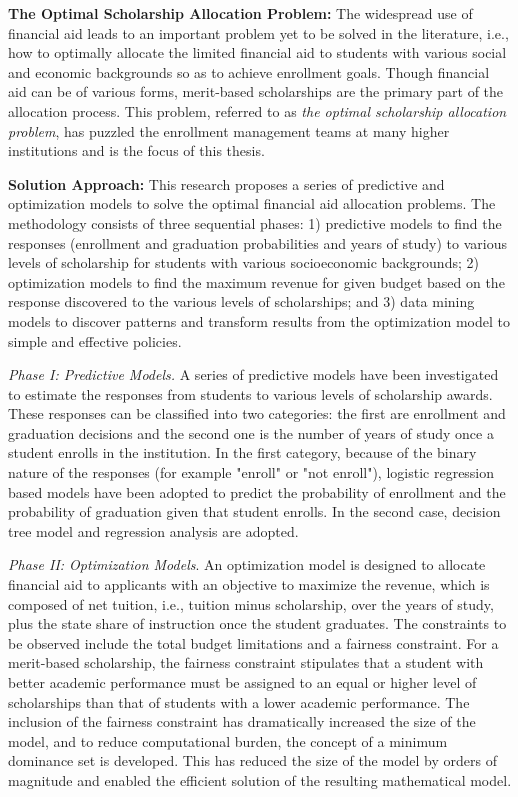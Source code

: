 \documentclass[12pt,english]{report}
\begin{document}
\vspace*{0.15in} 
\noindent \textbf{The Optimal Scholarship Allocation Problem:}  The widespread use of financial aid leads to an important problem yet to be solved in the literature, i.e., how to optimally allocate the limited financial aid to students with various social and economic backgrounds so as to achieve enrollment goals. Though financial aid can be of various forms, merit-based scholarships are the primary part of the allocation process. This problem, referred to as \textit{the optimal scholarship allocation problem}, has puzzled the enrollment management teams at many higher institutions and is the focus of this thesis.

\newpage
\noindent \textbf{Solution Approach:}  This research proposes a series of predictive and optimization models to solve the optimal financial aid allocation problems. The methodology consists of three sequential phases: 1) predictive models to find the responses (enrollment and graduation probabilities and years of study) to various levels of scholarship for students with various socioeconomic backgrounds; 2)  optimization models to find the maximum revenue for given budget based on the response discovered to the various levels of scholarships; and 3) data mining models to discover patterns and transform results from the optimization model to simple and effective policies. %

\vspace*{.1in} 
\noindent \textit{Phase I: Predictive Models.} A series of predictive models have been investigated to estimate the responses from students to various levels of scholarship awards. These responses can be classified into two categories: the first are enrollment and graduation decisions and the second one is the number of years of study once a student enrolls in the institution. In the first category, because of the binary nature of the responses (for example "enroll" or "not enroll"), logistic regression based models have been adopted to predict the probability of enrollment and the probability of graduation given that student enrolls. In the second case, decision tree model and regression analysis are adopted.

\vspace*{.1in} 
\noindent \textit{Phase II: Optimization Models}. An optimization model is designed to allocate financial aid to applicants with an objective to maximize the revenue, which is composed of net tuition, i.e., tuition minus scholarship, over the years of study, plus the state share of instruction once the student graduates. The constraints to be observed include the total budget limitations and a fairness constraint. For a merit-based scholarship, the fairness constraint stipulates that a student with better academic performance must be assigned to an equal or higher level of scholarships than that of students with a lower academic performance. The inclusion of the fairness constraint has dramatically increased the size of the model, and to reduce computational burden, the concept of a minimum dominance set is developed.  This has reduced the size of the model by orders of magnitude and enabled the efficient solution of the resulting mathematical model. 
\end{document}

